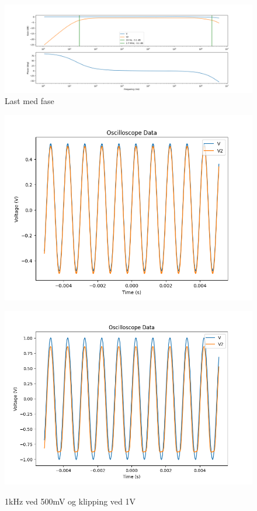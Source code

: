 \begin{figure}[H]
\centering
\includegraphics[scale=0.4]{bilder/Bodeplot+Pase_Last.png}
\caption{Last med fase}
\label{fig:Last+Pase}
\end{figure}




\begin{figure}[H]
    \centering
    \begin{minipage}[c]{0.49\textwidth}
        \centering
        \includegraphics[width=1\textwidth]{Bilder/Scope_Nice.png} 
        \caption{1kHz ved 500mV og klipping ved 1V}
        \label{fig:Scope_Nice}
    \end{minipage}
    \hfill
    \begin{minipage}[c]{0.49\textwidth}
        \centering
        \includegraphics[width=1\textwidth]{Bilder/Scope_Unice.png} 
        \label{fig:Scope_Unice}
    \end{minipage}
\end{figure}
